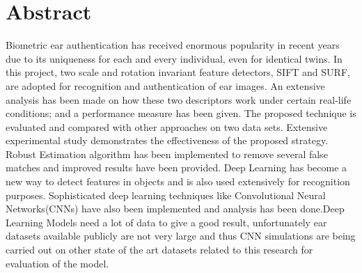 \chapter*{Abstract} 

Biometric ear authentication has received enormous popularity in recent years due to its uniqueness for each and every individual, even for identical twins. In this project, two scale and rotation invariant feature detectors, SIFT and SURF, are adopted for recognition and authentication of ear images. An extensive analysis has been made on how these two descriptors work under certain real-life conditions; and a performance measure has been given. The proposed technique is evaluated and compared with other approaches on two data sets. Extensive experimental study demonstrates the effectiveness of the proposed strategy. Robust Estimation algorithm has been implemented to remove several false matches and improved results have been provided. Deep Learning has become a new way to detect features in objects and is also used extensively for recognition purposes. Sophisticated deep learning techniques like Convolutional Neural Networks(CNNs) have also been implemented and analysis has been done.Deep Learning Models need a lot of data to give a good result, unfortunately ear datasets available publicly are not very large and thus CNN simulations are being carried out on other state of the art datasets related to this research for evaluation of the model.


